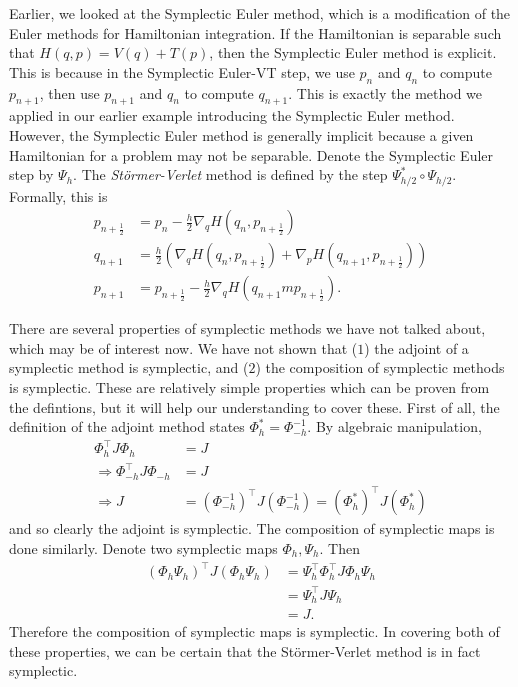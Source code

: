 \documentclass{report}
\theoremstyle{exampstyle} \newtheorem{example}[theorem]{Example}
\theoremstyle{exampstyle} \newtheorem{remark}[theorem]{Remark}
\theoremstyle{exampstyle} \newtheorem{definition}[theorem]{Definition}
\theoremstyle{exampstyle} \newtheorem{lemma}[theorem]{Lemma}
\begin{document}
Earlier, we looked at the Symplectic Euler method, which is a modification of the Euler methods for Hamiltonian integration.
If the Hamiltonian is separable such that $H(q,p) = V(q) + T(p)$, then the Symplectic Euler method is explicit.
This is because in the Symplectic Euler-VT step, we use $p_n$ and $q_n$ to compute $p_{n+1}$, then use $p_{n+1}$ and $q_n$ to compute $q_{n+1}$.
This is exactly the method we applied in our earlier example introducing the Symplectic Euler method.
However, the Symplectic Euler method is generally implicit because a given Hamiltonian for a problem may not be separable.
Denote the Symplectic Euler step by $\Psi_h$. The \textit{St\"{o}rmer-Verlet} method is defined by the step $\Psi_{h/2}^* \circ \Psi_{h/2}$.
Formally, this is
\begin{align*}
	p_{n+\frac{1}{2}} &= p_n - \frac{h}{2}\nabla_q H(q_n, p_{n+\frac{1}{2}}) \\
	q_{n+1} &= \frac{h}{2}\left( \nabla_q H(q_n, p_{n+\frac{1}{2}}) + \nabla_p H(q_{n+1}, p_{n+\frac{1}{2}}) \right) \\
	p_{n+1} &= p_{n+\frac{1}{2}} - \frac{h}{2} \nabla_q H(q_{n+1}m p_{n+\frac{1}{2}}).
\end{align*}

There are several properties of symplectic methods we have not talked about, which may be of interest now.
We have not shown that ($1$) the adjoint of a symplectic method is symplectic, and ($2$) the composition of symplectic methods is symplectic.
These are relatively simple properties which can be proven from the defintions, but it will help our understanding to cover these.
First of all, the definition of the adjoint method states $\Phi^*_h = \Phi^{-1}_{-h}$.
By algebraic manipulation,
\begin{align*}
	\Phi_h^\intercal J \Phi_h &= J \\
	\Rightarrow \Phi_{-h}^\intercal J \Phi_{-h} &= J \\
	\Rightarrow J &= (\Phi_{-h}^{-1})^\intercal J (\Phi_{-h}^{-1}) = (\Phi_h^*)^\intercal J (\Phi_h^*)
\end{align*}
and so clearly the adjoint is symplectic.
The composition of symplectic maps is done similarly. Denote two symplectic maps $\Phi_h, \Psi_h$. Then
\begin{align*}
	\left(\Phi_h \Psi_h\right)^\intercal J \left(\Phi_h \Psi_h\right) &= \Psi_h^\intercal \Phi_h^\intercal J \Phi_h \Psi_h \\
	&= \Psi_h^\intercal J \Psi_h \\
	&= J.
\end{align*}
Therefore the composition of symplectic maps is symplectic.
In covering both of these properties, we can be certain that the St\"{o}rmer-Verlet method is in fact symplectic.
\end{document}
